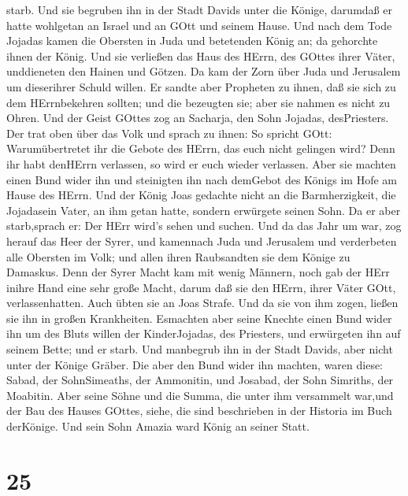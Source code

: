 starb.  Und sie begruben ihn in der Stadt Davids unter die
Könige, darumdaß er hatte wohlgetan an Israel und an GOtt und seinem
Hause.  Und nach dem Tode Jojadas kamen die Obersten in
Juda und betetenden König an; da gehorchte ihnen der König.
 Und sie verließen das Haus des HErrn, des GOttes ihrer
Väter, unddieneten den Hainen und Götzen. Da kam der Zorn über Juda und
Jerusalem um dieserihrer Schuld willen.  Er sandte aber
Propheten zu ihnen, daß sie sich zu dem HErrnbekehren sollten; und die
bezeugten sie; aber sie nahmen es nicht zu Ohren.  Und der
Geist GOttes zog an Sacharja, den Sohn Jojadas, desPriesters. Der trat
oben über das Volk und sprach zu ihnen: So spricht GOtt: Warumübertretet
ihr die Gebote des HErrn, das euch nicht gelingen wird? Denn ihr habt
denHErrn verlassen, so wird er euch wieder verlassen.  Aber
sie machten einen Bund wider ihn und steinigten ihn nach demGebot des
Königs im Hofe am Hause des HErrn.  Und der König Joas
gedachte nicht an die Barmherzigkeit, die Jojadasein Vater, an ihm getan
hatte, sondern erwürgete seinen Sohn. Da er aber starb,sprach er: Der
HErr wird's sehen und suchen.  Und da das Jahr um war, zog
herauf das Heer der Syrer, und kamennach Juda und Jerusalem und
verderbeten alle Obersten im Volk; und allen ihren Raubsandten sie dem
Könige zu Damaskus.  Denn der Syrer Macht kam mit wenig
Männern, noch gab der HErr inihre Hand eine sehr große Macht, darum daß
sie den HErrn, ihrer Väter GOtt, verlassenhatten. Auch übten sie an Joas
Strafe.  Und da sie von ihm zogen, ließen sie ihn in großen
Krankheiten. Esmachten aber seine Knechte einen Bund wider ihn um des
Bluts willen der KinderJojadas, des Priesters, und erwürgeten ihn auf
seinem Bette; und er starb. Und manbegrub ihn in der Stadt Davids, aber
nicht unter der Könige Gräber.  Die aber den Bund wider ihn
machten, waren diese: Sabad, der SohnSimeaths, der Ammonitin, und
Josabad, der Sohn Simriths, der Moabitin.  Aber seine Söhne
und die Summa, die unter ihm versammelt war,und der Bau des Hauses
GOttes, siehe, die sind beschrieben in der Historia im Buch derKönige.
Und sein Sohn Amazia ward König an seiner Statt.

\hypertarget{section-24}{%
\section{25}\label{section-24}}

